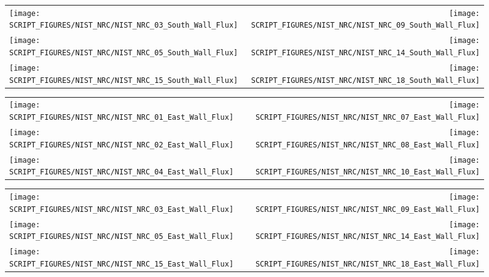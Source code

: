 \begin{figure}[p]
\begin{tabular*}{\textwidth}{l@{\extracolsep{\fill}}r}
\texttt{[image: SCRIPT\_FIGURES/NIST\_NRC/NIST\_NRC\_03\_South\_Wall\_Flux]} &
\texttt{[image: SCRIPT\_FIGURES/NIST\_NRC/NIST\_NRC\_09\_South\_Wall\_Flux]} \\
\texttt{[image: SCRIPT\_FIGURES/NIST\_NRC/NIST\_NRC\_05\_South\_Wall\_Flux]} &
\texttt{[image: SCRIPT\_FIGURES/NIST\_NRC/NIST\_NRC\_14\_South\_Wall\_Flux]} \\
\texttt{[image: SCRIPT\_FIGURES/NIST\_NRC/NIST\_NRC\_15\_South\_Wall\_Flux]} &
\texttt{[image: SCRIPT\_FIGURES/NIST\_NRC/NIST\_NRC\_18\_South\_Wall\_Flux]}
\end{tabular*}
\label{NIST_NRC_South_Wall_Flux_Open}
\end{figure}


\begin{figure}[p]
\begin{tabular*}{\textwidth}{l@{\extracolsep{\fill}}r}
\texttt{[image: SCRIPT\_FIGURES/NIST\_NRC/NIST\_NRC\_01\_East\_Wall\_Flux]} &
\texttt{[image: SCRIPT\_FIGURES/NIST\_NRC/NIST\_NRC\_07\_East\_Wall\_Flux]} \\
\texttt{[image: SCRIPT\_FIGURES/NIST\_NRC/NIST\_NRC\_02\_East\_Wall\_Flux]} &
\texttt{[image: SCRIPT\_FIGURES/NIST\_NRC/NIST\_NRC\_08\_East\_Wall\_Flux]} \\
\texttt{[image: SCRIPT\_FIGURES/NIST\_NRC/NIST\_NRC\_04\_East\_Wall\_Flux]} &
\texttt{[image: SCRIPT\_FIGURES/NIST\_NRC/NIST\_NRC\_10\_East\_Wall\_Flux]}
\end{tabular*}
\label{NIST_NRC_East_Wall_Flux_Closed}
\end{figure}

\begin{figure}[p]
\begin{tabular*}{\textwidth}{l@{\extracolsep{\fill}}r}
\texttt{[image: SCRIPT\_FIGURES/NIST\_NRC/NIST\_NRC\_03\_East\_Wall\_Flux]} &
\texttt{[image: SCRIPT\_FIGURES/NIST\_NRC/NIST\_NRC\_09\_East\_Wall\_Flux]} \\
\texttt{[image: SCRIPT\_FIGURES/NIST\_NRC/NIST\_NRC\_05\_East\_Wall\_Flux]} &
\texttt{[image: SCRIPT\_FIGURES/NIST\_NRC/NIST\_NRC\_14\_East\_Wall\_Flux]} \\
\texttt{[image: SCRIPT\_FIGURES/NIST\_NRC/NIST\_NRC\_15\_East\_Wall\_Flux]} &
\texttt{[image: SCRIPT\_FIGURES/NIST\_NRC/NIST\_NRC\_18\_East\_Wall\_Flux]}
\end{tabular*}
\label{NIST_NRC_East_Wall_Flux_Open}
\end{figure}


